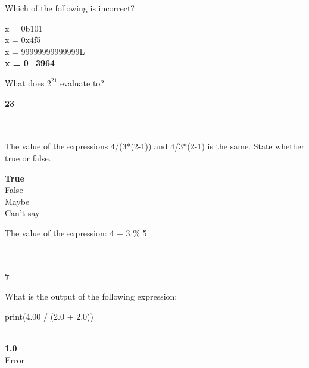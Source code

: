 \documentclass{exam}
\begin{document}
\begin{questions}
    \question Which of the following is incorrect?

    \begin{oneparchoices}
        \choice x = 0b101\\
        \choice x = 0x4f5\\
        \choice x = 99999999999999L\\
        \choice \textbf{x = 0\_3964}
    \end{oneparchoices}

    \question What does $2 ^ 21$ evaluate to?

    \begin{oneparchoices}
        \choice \textbf{23}\\
        \\
        \\
    \end{oneparchoices}

    \question The value of the expressions 4/(3*(2-1)) and 4/3*(2-1) is the same. State whether true or false.

    \begin{oneparchoices}
        \choice \textbf{True}\\
        \choice False\\
        \choice Maybe\\
        \choice Can't say
    \end{oneparchoices}

    \question The value of the expression: 4 + 3 \% 5

    \begin{oneparchoices}
        \\
        \\
        \choice \textbf{7}\\
    \end{oneparchoices}

    \question What is the output of the following expression:

            print(4.00 / (2.0 + 2.0))

     \begin{oneparchoices}
         \\
         \choice \textbf{1.0}\\
         \choice Error\\
         \\
     \end{oneparchoices}


\end{questions}
\end{document}
